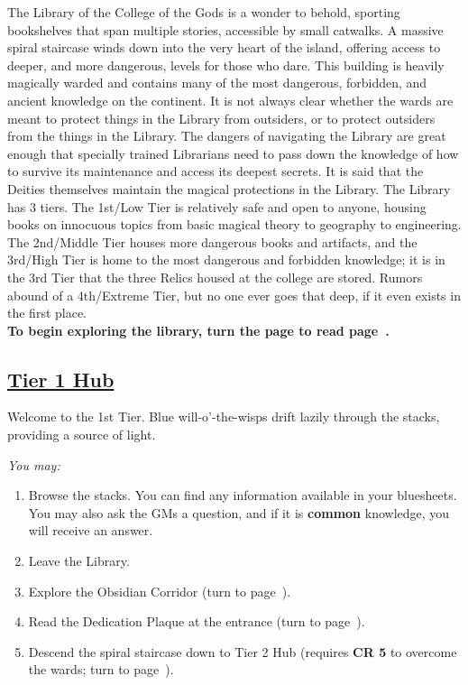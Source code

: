 \documentclass[sheet]{GL2020}
\begin{document}
The Library of the College of the Gods is a wonder to behold, sporting bookshelves that span multiple stories, accessible by small catwalks. A massive spiral staircase winds down into the very heart of the island, offering access to deeper, and more dangerous, levels for those who dare. This building is heavily magically warded and contains many of the most dangerous, forbidden, and ancient knowledge on the continent. It is not always clear whether the wards are meant to protect things in the Library from outsiders, or to protect outsiders from the things in the Library. The dangers of navigating the Library are great enough that specially trained Librarians need to pass down the knowledge of how to survive its maintenance and access its deepest secrets. It is said that the Deities themselves maintain the magical protections in the Library. The Library has 3 tiers. The 1st/Low Tier is relatively safe and open to anyone, housing books on innocuous topics from basic magical theory to geography to engineering. The 2nd/Middle Tier houses more dangerous books and artifacts, and the 3rd/High Tier is home to the most dangerous and forbidden knowledge; it is in the 3rd Tier that the three Relics housed at the college are stored. Rumors abound of a 4th/Extreme Tier, but no one ever goes that deep, if it even exists in the first place.\\


{\large \textbf{To begin exploring the library, turn the page to read page~\pageref{TierOneHub}.}}


\clearpage

\setcounter{page}{1}

\begin{center}\section*{\underline{Tier 1 Hub}}\end{center}
\label{TierOneHub}

Welcome to the 1st Tier. Blue will-o’-the-wisps drift lazily through the stacks, providing a source of light. 

\begingroup
\itshape
You may:
\begin{enumerate}[A]
	\item Browse the stacks. You can find any information available in your bluesheets. You may also ask the GMs a question, and if it is \textbf{common} knowledge, you will receive an answer.
	\item Leave the Library.
	\item Explore the Obsidian Corridor (turn to page~\pageref{ObsidianCorridor}).
	\item Read the Dedication Plaque at the entrance (turn to page~\pageref{LibraryDedication}).
	\item Descend the spiral staircase down to Tier 2 Hub (requires \textbf{CR 5} to overcome the wards; turn to page~\pageref{TierTwoHub}).
\end{enumerate}
\endgroup
\end{document}
